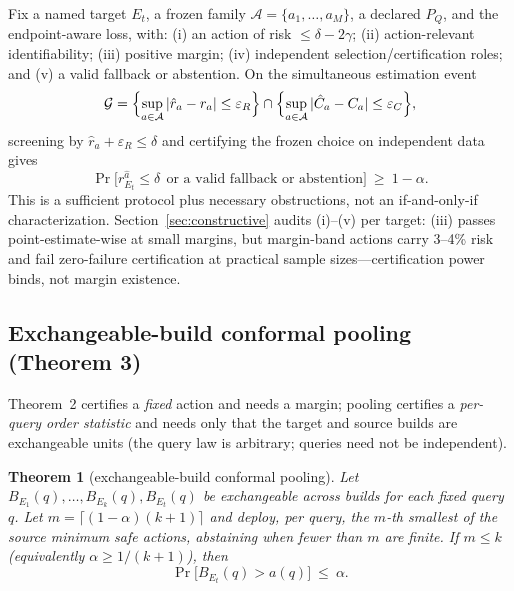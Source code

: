 \documentclass{article}
\newtheorem{theorem}{Theorem}
\renewcommand{\Pr}{\mathop{\mathrm{Pr}}}   %
\newcommand{\Acal}{\mathcal{A}}
\begin{document}
Fix a named target $E_t$, a frozen family $\Acal=\{a_1,\dots,a_M\}$, a declared $P_Q$, and the
endpoint-aware loss, with: (i) an action of risk $\le\delta-2\gamma$; (ii) action-relevant
identifiability; (iii) positive margin; (iv) independent selection/certification roles; and (v) a valid
fallback or abstention. On the simultaneous estimation event
\begin{equation}
\mathcal{G}
=\Bigl\{\sup_{a\in\Acal}|\hat r_{a}-r_{a}|\le\varepsilon_{R}\Bigr\}
\cap\Bigl\{\sup_{a\in\Acal}|\hat C_{a}-C_{a}|\le\varepsilon_{C}\Bigr\},
\label{eq:eventG}
\end{equation}
screening by $\hat r_{a}+\varepsilon_{R}\le\delta$ and certifying the frozen choice on independent data
gives
\begin{equation}
\Pr\bigl[r_{E_{t}}^{\hat a}\le\delta\ \ \text{or a valid fallback or abstention}\bigr]\ \ge\ 1-\alpha.
\label{eq:thm2}
\end{equation}
This is a sufficient protocol plus necessary obstructions, not an if-and-only-if characterization.
Section~\ref{sec:constructive} audits (i)--(v) per target: (iii) passes point-estimate-wise at small
margins, but margin-band actions carry 3--4\% risk and fail zero-failure certification at practical sample
sizes---certification power binds, not margin existence.

\subsection{Exchangeable-build conformal pooling (Theorem 3)}
\label{sec:thm3}

Theorem~2 certifies a \emph{fixed} action and needs a margin; pooling certifies a \emph{per-query order
statistic} and needs only that the target and source builds are exchangeable units (the query law is
arbitrary; queries need not be independent).

\begin{theorem}[exchangeable-build conformal pooling]
Let $B_{E_1}(q),\dots,B_{E_k}(q),B_{E_t}(q)$ be exchangeable across builds for each fixed query $q$.
Let $m=\lceil(1-\alpha)(k+1)\rceil$ and deploy, per query, the $m$-th smallest of the source minimum safe
actions, abstaining when fewer than $m$ are finite. If $m\le k$ (equivalently $\alpha\ge 1/(k+1)$), then
\begin{equation}
\Pr\bigl[B_{E_t}(q)>a(q)\bigr]\ \le\ \alpha.
\label{eq:thm3}
\end{equation}
\end{theorem}
\end{document}
